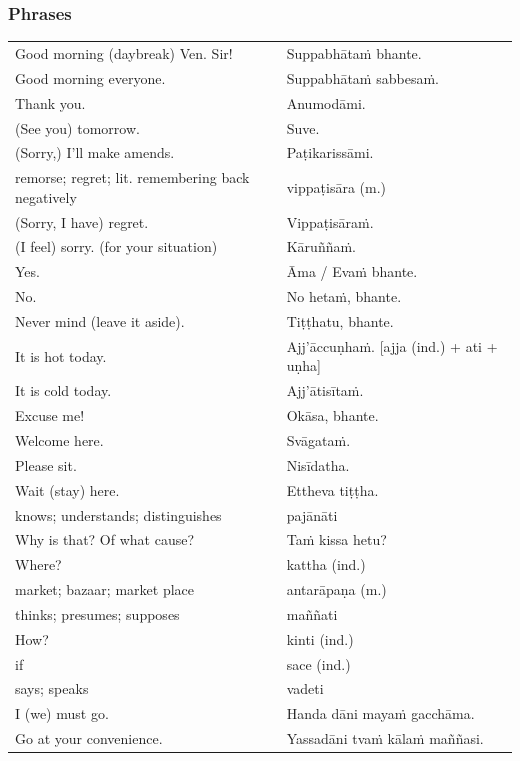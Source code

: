 \documentclass[11pt,oneside]{memoir}
\begin{document}
\normalArrayStrech

\clearpage

\subsubsection{Phrases}
\label{sec:org69046e3}

\begin{center}
\begin{tabular}{ll}
Good morning (daybreak) Ven. Sir! & Suppabhātaṁ bhante.\\[0pt]
Good morning everyone. & Suppabhātaṁ sabbesaṁ.\\[0pt]
Thank you. & Anumodāmi.\\[0pt]
(See you) tomorrow. & Suve.\\[0pt]
(Sorry,) I'll make amends. & Paṭikarissāmi.\\[0pt]
remorse; regret; lit. remembering back negatively & vippaṭisāra (m.)\\[0pt]
(Sorry, I have) regret. & Vippaṭisāraṁ.\\[0pt]
(I feel) sorry. (for your situation) & Kāruññaṁ.\\[0pt]
Yes. & Āma / Evaṁ bhante.\\[0pt]
No. & No hetaṁ, bhante.\\[0pt]
Never mind (leave it aside). & Tiṭṭhatu, bhante.\\[0pt]
It is hot today. & Ajj'āccuṇhaṁ. [ajja (ind.) + ati  + uṇha]\\[0pt]
It is cold today. & Ajj'ātisītaṁ.\\[0pt]
Excuse me! & Okāsa, bhante.\\[0pt]
Welcome here. & Svāgataṁ.\\[0pt]
Please sit. & Nisīdatha.\\[0pt]
Wait (stay) here. & Ettheva tiṭṭha.\\[0pt]
knows; understands; distinguishes & pajānāti\\[0pt]
Why is that? Of what cause? & Taṁ kissa hetu?\\[0pt]
Where? & kattha (ind.)\\[0pt]
market; bazaar; market place & antarāpaṇa (m.)\\[0pt]
thinks; presumes; supposes & maññati\\[0pt]
How? & kinti (ind.)\\[0pt]
if & sace (ind.)\\[0pt]
says; speaks & vadeti\\[0pt]
I (we) must go. & Handa dāni mayaṁ gacchāma.\\[0pt]
Go at your convenience. & Yassadāni tvaṁ kālaṁ maññasi.\\[0pt]
\end{tabular}
\end{center}
\end{document}
